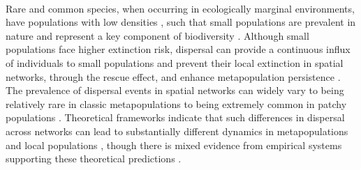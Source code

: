 \paragraph*{}
Rare and common species, when occurring in ecologically marginal environments, have populations with low densities \parencite{brown1984, lawton1993}, such that small populations are prevalent in nature and represent a key component of biodiversity \parencite{preston1948,ehrlich1993}. Although small populations face higher extinction risk, dispersal can provide a continuous influx of individuals to small populations and prevent their local extinction in spatial networks, through the rescue effect, and enhance metapopulation persistence \parencite{brown1977, abbott2011}. The prevalence of dispersal events in spatial networks can widely vary to being relatively rare in classic metapopulations to being extremely common in patchy populations \parencite{elmhagen2001, ovaskainen2004, fronhofer2012}. Theoretical frameworks indicate that such differences in dispersal across networks can lead to substantially different dynamics in metapopulations and local populations \parencite{heino1997,abbott2011,gilarranz2012,wang2015}, though there is mixed evidence from empirical systems supporting these theoretical predictions \parencite{yang2022}. 


